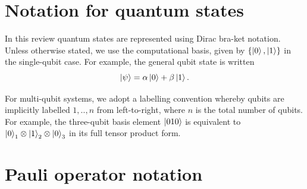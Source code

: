 \documentclass[]{arxiv}
\theoremstyle{plain}%
\theoremstyle{definition}
\theoremstyle{remark}
\begin{document}
%









\appendix

\section{Notation for quantum states}\label{sec:notation}

In this review quantum states are represented using Dirac bra-ket notation. Unless otherwise stated, we use the computational basis, given by $\{\ket{0},\ket{1} \}$ in the single-qubit case. For example, the general qubit state is written \begin{equation}
\ket{\psi}=\alpha\ket{0}+\beta\ket{1}\rm.
\end{equation}

For multi-qubit systems, we adopt a labelling convention whereby qubits are implicitly labelled $1,..,n$ from left-to-right, where $n$ is the total number of qubits. For example, the three-qubit basis element $\ket{010}$ is equivalent to $\ket{0}_1\otimes \ket{1}_2 \otimes \ket{0}_3$ in its full tensor product form.

 

\section{Pauli operator notation}\label{app:pauli}
\end{document}
